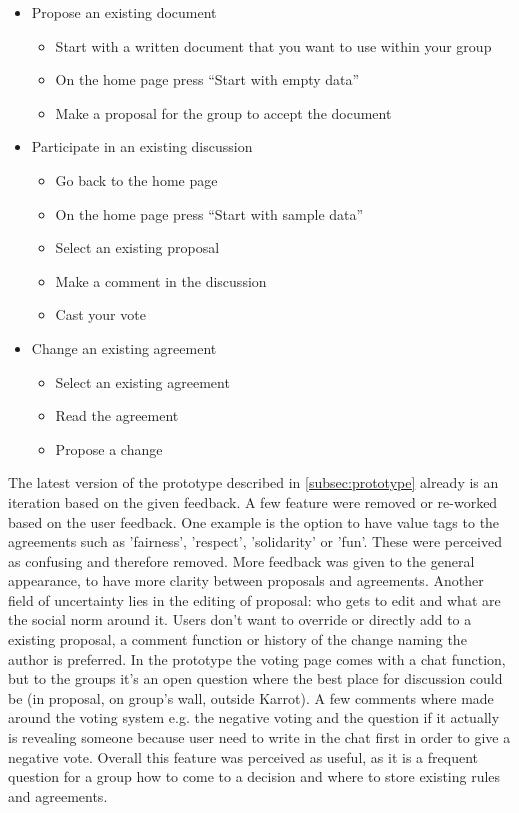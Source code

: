 \documentclass[
	a4paper,%
	11pt,%
	]{article}
\begin{document}
\begin{itemize}
	\item Propose an existing document
		\begin{itemize}
			 \item Start with a written document that you want to use within your group
			 \item On the home page press “Start with empty data”
			 \item Make a proposal for the group to accept the document
		\end{itemize}
	\item Participate in an existing discussion
		\begin{itemize}
  			  \item Go back to the home page
  			  \item On the home page press “Start with sample data”
   			  \item Select an existing proposal
    			  \item Make a comment in the discussion
    		  	  \item Cast your vote
		\end{itemize}
	\item Change an existing agreement
		\begin{itemize}
   			 \item Select an existing agreement
    			 \item Read the agreement
    			 \item Propose a change
		\end{itemize}	
	
\end{itemize}

The latest version of the prototype described in \autoref{subsec:prototype} already is an iteration based on the given feedback. A few feature were removed or re-worked based on the user feedback. One example is the option to have value tags to the agreements such as 'fairness', 'respect', 'solidarity' or 'fun'. These were perceived as confusing and therefore removed. More feedback was given to the general appearance, to have more clarity between proposals and agreements. Another field of uncertainty lies in the editing of proposal: who gets to edit and what are the social norm around it. Users don't want to override or directly add to a existing proposal, a comment function or history of the change naming the author is preferred. In the prototype the voting page comes with a chat function, but to the groups it's an open question where the best place for discussion could be (in proposal, on group's wall, outside Karrot). A few comments where made around the voting system e.g. the negative voting and the question if it actually is revealing someone because user need to write in the chat first in order to give a negative vote. Overall this feature was perceived as useful, as it is a frequent question for a group how to come to a decision and where to store existing rules and agreements.
\end{document}
